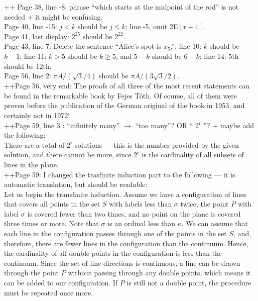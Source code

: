 \documentclass[11pt]{article}
\begin{document}
++ Page 38, line -8: phrase ``which starts at the midpoint of the rod'' is not needed + it might be confusing.\\

Page 40, line -15: $j < k$ should be $j \le k$; line -5, omit 2E$[x+1]$.\\

Page 41, last display: $2^{25}$ should be $2^{22}$.\\

Page 43, line 7: Delete the sentence ``Alice's spot is $x_5$.'';
line 10: $k$ should be $k{-}1$;
line 11: $k>5$ should be $k\ge 5$, and $5{-}k$ should be $6{-}k$;
line 14: $5$th should be $12$th.\\

Page 56, line 2: $\pi A/(\sqrt{3}/4)$ should be $\pi A/(3\sqrt{3}/2)$.\\

++Page 56, very end: The proofs of all three of the most recent statements can be found in the remarkable book by Fejes Tóth. Of course, all of them were proven before the publication of the German original of the book in 1953, and certainly not in 1972!\\

++Page 59, line 3 : ``infinitely many'' $\to$ ``too many''? OR `` $2^{\mathfrak{c}}$ ''? + maybe add the following:\\

There are a total of \( 2^{\mathfrak{c}} \) solutions — this is the number provided by the given solution, and there cannot be more, since \( 2^{\mathfrak{c}} \) is the cardinality of all subsets of lines in the plane.\\

++Page 59: I changed the trasfinite induction part to the following --- it is automatic translation, but should be readable:\\

Let us begin the transfinite induction.
Assume we have a configuration of lines that covers all points in the set \( S \) with labels less than \( \sigma \) twice,
the point \( P \) with label \( \sigma \) is covered fewer than two times,
and no point on the plane is covered three times or more.
Note that \( \sigma \) is an ordinal less than \( \kappa \).
We can assume that each line in the configuration passes through one of the points in the set \( S \),
and, therefore, there are fewer lines in the configuration than the continuum.
Hence, the cardinality of all double points in the configuration is less than the continuum.
Since the set of line directions is continuous, a line can be drawn through the point \( P \) without passing through any double points,
which means it can be added to our configuration.
If \( P \) is still not a double point, the procedure must be repeated once more.\\
\end{document}
